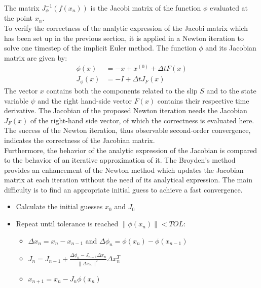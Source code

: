 The matrix $J_\phi^{-1}(f(x_n))$ is the Jacobi matrix of the function $\phi$ evaluated at the point $x_n$. \\
To verify the correctness of the analytic expression of the Jacobi matrix which has been set up in the previous section, it is applied in a Newton iteration to solve one timestep of the implicit Euler method. The function $\phi$ and its Jacobian matrix are given by: 
\begin{align}
	\phi(x) &= -x + x^{(0)} + \Delta t F(x) \\
	J_\phi(x) &= -I + \Delta t J_F(x)
\end{align}
The vector $x$ contains both the components related to the slip $S$ and to the state variable $\psi$ and the right hand-side vector $F(x)$ contains their respective time derivative. The Jacobian of the proposed Newton iteration needs the Jacobian $J_F(x)$ of the right-hand side vector, of which the correctness is evaluated here. The success of the Newton iteration, thus observable second-order convergence, indicates the correctness of the Jacobian matrix. \\
Furthermore, the behavior of the analytic expression of the Jacobian is compared to the behavior of an iterative approximation of it. The Broyden's method \cite{BroydenIteration} provides an enhancement of the Newton method which updates the Jacobian matrix at each iteration without the need of its analytical expression. The main difficulty is to find an appropriate initial guess to achieve a fast convergence. 

\begin{itemize}
	\item Calculate the initial guesses $x_0$ and $J_0$
	\item Repeat until tolerance is reached $\|\phi(x_n)\| < TOL$: 
	\begin{itemize}
		\item $\Delta x_n = x_n - x_{n-1}$ and $\Delta \phi_n = \phi(x_n) - \phi(x_{n-1})$ 
		\item $J_n = J_{n-1} + \frac{\Delta \phi_n - J_{n-1}\Delta x_n}{\|\Delta x_n\|^2} \Delta x_n^T$
		\item $x_{n+1} = x_n - J_n \phi(x_n)$
	\end{itemize} 
\end{itemize}

